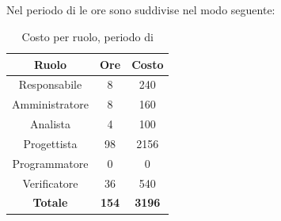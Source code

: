 \subsection{\PD}
Nel periodo di \PD{} le ore sono suddivise nel modo seguente:
\begin{table}[H]
	\centering
	\begin{tabular}{|c|c|c|}
		\hline
		\textbf{Ruolo} &
		\textbf{Ore} &
		\textbf{Costo} \\
		\hline
		Responsabile & 8 & 240 \\
		\hline
		Amministratore & 8 & 160 \\
		\hline
		Analista & 4 & 100\\
		\hline
		Progettista & 98 & 2156 \\
		\hline
		Programmatore & 0 & 0 \\
		\hline
		Verificatore & 36 & 540 \\
		\hline
		\textbf{Totale} & \textbf{154} & \textbf{3196} \\
		\hline
	\end{tabular}
	\caption{Costo per ruolo, periodo di \PD}
\end{table}

